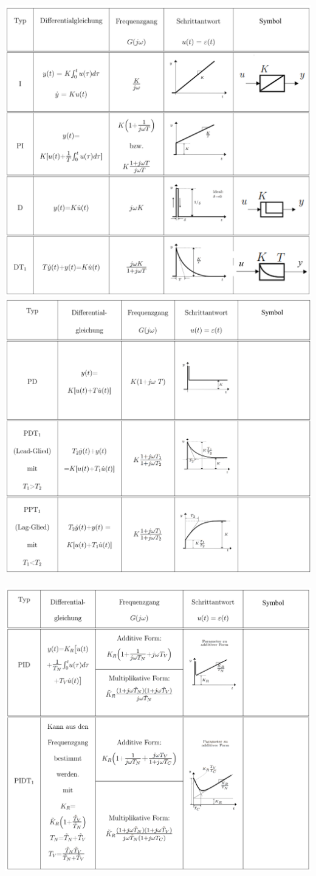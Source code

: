 \includegraphics[width=12 cm]{./bilder/glieder3.png} \newpage
\includegraphics[width=12 cm]{./bilder/glieder4.png} \\\\
\includegraphics[width=12 cm]{./bilder/glieder5.png} \newpage

